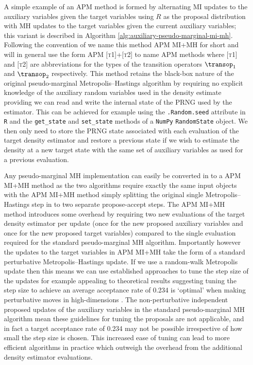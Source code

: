 A simple example of an \ac{APM} method is formed by alternating \ac{MI} updates to the auxiliary variables given the target variables using $R$ as the proposal distribution with \ac{MH} updates to the target variables given the current auxiliary variables; this variant is described in Algorithm \ref{alg:auxiliary-pseudo-marginal-mi-mh}. Following the convention of \citep{murray2016pseudo} we name this method \ac{APM} \ac{MI}+\ac{MH} for short and will in general use the form \ac{APM} \textsc{[t1]}+\textsc{[t2]} to name \ac{APM} methods where \textsc{[t1]} and \textsc{[t2]} are abbreviations for the types of the transition operators $\transop_1$ and $\transop_2$ respectively. This method retains the black-box nature of the original pseudo-marginal Metropolis--Hastings algorithm by requiring no explicit knowledge of the auxiliary random variables used in the density estimate providing we can read and write the internal state of the \ac{PRNG} used by the estimator. This can be achieved for example using the \texttt{.Random.seed} attribute in \texttt{R} and the \texttt{get\_state} and \texttt{set\_state} methods of a \texttt{NumPy} \texttt{RandomState} object. We then only need to store the \ac{PRNG} state associated with each evaluation of the target density estimator and restore a previous state if we wish to estimate the density at a new target state with the same set of auxiliary variables as used for a previous evaluation.

Any pseudo-marginal \ac{MH} implementation can easily be converted in to a \ac{APM} \ac{MI}+\ac{MH} method as the two algorithms require exactly the same input objects with the \ac{APM} \ac{MI}+\ac{MH} method simply splitting the original single Metropolis--Hastings step in to two separate propose-accept steps. The \ac{APM} \ac{MI}+\ac{MH} method introduces some overhead by requiring two new evaluations of the target density estimator per update (once for the new proposed auxiliary variables and once for the new proposed target variables) compared to the single evaluation required for the standard pseudo-marginal \ac{MH} algorithm. Importantly however the updates to the target variables in \ac{APM} \ac{MI}+\ac{MH} take the form of a standard perturbative Metropolis--Hastings update. If we use a random-walk Metropolis update then this means we can use established approaches to tune the step size of the updates for example appealing to theoretical results suggesting tuning the step size to achieve an average acceptance rate of 0.234 is `optimal' when making perturbative moves in high-dimensions \citep{gelman1997weak}. The non-perturbative independent proposed updates of the auxiliary variables in the standard pseudo-marginal \ac{MH} algorithm mean these guidelines for tuning the proposals are not applicable, and in fact a target acceptance rate of 0.234 may not be possible irrespective of how small the step size is chosen. This increased ease of tuning can lead to more efficient algorithms in practice which outweigh the overhead from the additional density estimator evaluations.

